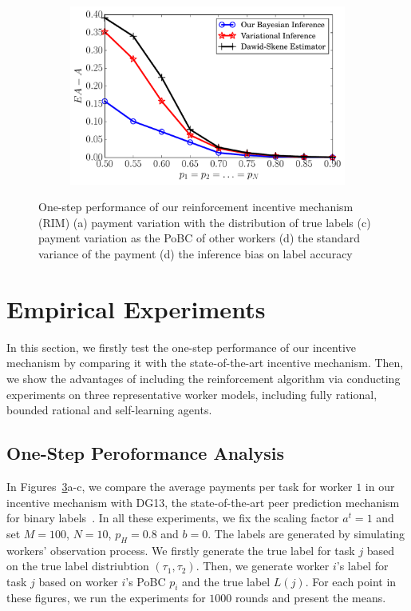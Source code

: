 \begin{figure}[!t]
\begin{subfigure}[t]{0.24\textwidth}
        \caption{\label{BIM4}}
    \end{subfigure}
	~
	\begin{subfigure}[t]{0.24\textwidth}
        \centering
        \includegraphics[width=\textwidth]{image/EXPC1}
        \caption{\label{BIM1}}
    \end{subfigure}
    \caption{\label{BIM}One-step performance of our reinforcement incentive mechanism (RIM) (a) payment variation with the distribution of true labels (c) payment variation as the PoBC of other workers (d) the standard variance of the payment (d) the inference bias on label accuracy}
\end{figure}

\section{Empirical Experiments}
In this section, we firstly test the one-step performance of our incentive mechanism by comparing it with the state-of-the-art incentive mechanism.
Then, we show the advantages of including the reinforcement algorithm via conducting experiments on three representative worker models, including fully rational, bounded rational and self-learning agents.

\subsection{One-Step Peroformance Analysis}
In Figures~\ref{BIM}a-c, we compare the average payments per task for worker $1$ in our incentive mechanism with DG13, the state-of-the-art peer prediction mechanism for binary labels~\cite{dasgupta2013crowdsourced,liu2017sequential}.
In all these experiments, we fix the scaling factor $a^t=1$ and set $M=100$, $N=10$, $p_H=0.8$ and $b=0$.
The labels are generated by simulating workers' observation process.
We firstly generate the true label for task $j$ based on the true label distriubtion $(\tau_1, \tau_2)$.
Then, we generate worker $i$'s label for task $j$ based on worker $i$'s PoBC $p_i$ and the true label $L(j)$.
For each point in these figures, we run the experiments for $1000$ rounds and present the means.

